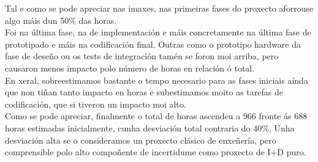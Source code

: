 Tal e como se pode apreciar nas imaxes, nas primeiras fases do proxecto
aforrouse algo máis dun 50\% das horas. \\

Foi na última fase, na de implementación e máis concretamente na última fase de
prototipado e máis na codificación final. Outras como o prototipo hardware da
fase de deseño ou os tests de integración tamén se foron moi arriba, pero
causaron menos impacto polo número de horas en relación ó total. \\

En xeral, sobreestimamos bastante o tempo necesario para as fases iniciais aínda
que non tiñan tanto impacto en horas e subestimamos moito as tarefas de
codificación, que si tiveron un impacto moi alto. \\

Como se pode apreciar, finalmente o total de horas ascendeu a 966 fronte ás 688
horas estimadas inicialmente, cunha desviación total contraria do 40\%. Unha
desviación alta se o consideramos un proxecto clásico de enxeñería, pero
comprensible polo alto compoñente de incertidume como proxecto de I+D puro. \\
